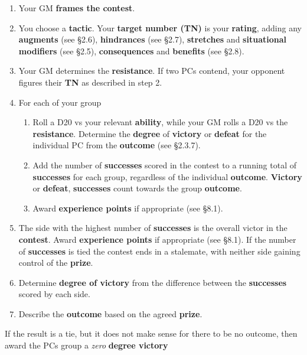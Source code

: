 \documentclass[
  11pt,
]{article}
\providecommand{\tightlist}{%
  \setlength{\itemsep}{0pt}\setlength{\parskip}{0pt}}
\begin{document}
\begin{enumerate}
\def\labelenumi{\arabic{enumi}.}
\tightlist
\item
  Your GM \textbf{frames the contest}.
\item
  You choose a \textbf{tactic}. Your \textbf{target number (TN)} is your
  \textbf{rating}, adding any \textbf{augments} (see §2.6),
  \textbf{hindrances} (see §2.7), \textbf{stretches} and
  \textbf{situational modifiers} (see §2.5), \textbf{consequences} and
  \textbf{benefits} (see §2.8).
\item
  Your GM determines the \textbf{resistance}. If two PCs contend, your
  opponent figures their \textbf{TN} as described in step 2.
\item
  For each of your group

  \begin{enumerate}
  \def\labelenumii{\arabic{enumii}.}
  \tightlist
  \item
    Roll a D20 vs your relevant \textbf{ability}, while your GM rolls a
    D20 vs the \textbf{resistance}. Determine the \textbf{degree} of
    \textbf{victory} or \textbf{defeat} for the individual PC from the
    \textbf{outcome} (see §2.3.7).
  \item
    Add the number of \textbf{successes} scored in the contest to a
    running total of \textbf{successes} for each group, regardless of
    the individual \textbf{outcome}. \textbf{Victory} or
    \textbf{defeat}, \textbf{successes} count towards the group
    \textbf{outcome}.
  \item
    Award \textbf{experience points} if appropriate (see §8.1).
  \end{enumerate}
\item
  The side with the highest number of \textbf{successes} is the overall
  victor in the \textbf{contest}. Award \textbf{experience points} if
  appropriate (see §8.1). If the number of \textbf{successes} is tied
  the contest ends in a stalemate, with neither side gaining control of
  the \textbf{prize}.
\item
  Determine \textbf{degree of victory} from the difference between the
  \textbf{successes} scored by each side.
\item
  Describe the \textbf{outcome} based on the agreed \textbf{prize}.
\end{enumerate}

If the result is a tie, but it does not make sense for there to be no
outcome, then award the PCs group a \emph{zero} \textbf{degree victory}
\end{document}
